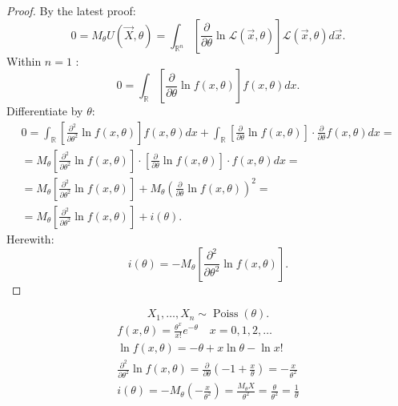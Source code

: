 \begin{proof}
    By the latest proof:
    \[
        0 = M_{\theta} U(\vec{X}, \theta) = \int_{\mathbb{R}^{n}}^{} 
        \left[ \frac{\partial }{\partial \theta} \ln
        \mathcal{L}(\vec{x}, \theta) \right] \mathcal{L}(\vec{x}, \theta) d\vec{x}
    .\] 
    Within $n = 1$ :
    \[
    0 = \int_{\mathbb{R}}^{} \left[ \frac{\partial }{\partial \theta} \ln
    f(x, \theta) \right] f(x, \theta) dx
    .\] 
    Differentiate by $\theta$:
    \begin{gather*}
        0 = \int_{\mathbb{R}}^{} \left[
        \frac{\partial^2}{\partial \theta^2} \ln f(x, \theta) \right]  
        f(x, \theta) dx + \int_{\mathbb{R}}^{} \left[ 
        \frac{\partial }{\partial \theta} \ln f(x, \theta) \right] \cdot
        \frac{\partial}{\partial \theta} f(x, \theta) dx = \\
        = M_{\theta} \left[ \frac{\partial ^2}{\partial \theta^2} \ln
        f(x, \theta) \right] \cdot \left[
        \frac{\partial }{\partial \theta} \ln f(x, \theta) \right] \cdot
        f(x, \theta) dx = \\
        = M_{\theta} \left[ \frac{\partial ^2}{\partial \theta^2} 
        \ln f(x, \theta) \right] + M_{\theta} \left(
        \frac{\partial }{\partial \theta} \ln f(x, \theta) \right) ^2 = \\
        = M_{\theta} \left[ \frac{\partial^2}{\partial \theta^2}
        \ln f(x, \theta) \right] + i(\theta).
    \end{gather*}
    Herewith:
    \[
    i(\theta) = -M_{\theta} \left[ \frac{\partial ^2}{\partial \theta^2}
    \ln f(x, \theta) \right]
    .\] 
\end{proof}

\begin{example}
    \[
    X_{1}, \ldots, X_{n} \sim \operatorname{Poiss}(\theta)
    .\] 
    \begin{gather*}
        f(x, \theta) = \frac{\theta^{x}}{x!} e^{-\theta} \quad x = 0,1,2,\ldots \\
        \ln f(x, \theta) = -\theta + x \ln \theta - \ln x! \\
        \frac{\partial ^2}{\partial \theta^2} \ln f(x, \theta) = 
        \frac{\partial }{\partial \theta} (-1 + \frac{x}{\theta}) =
        -\frac{x}{\theta^2} \\
        i(\theta) = - M_{\theta} \left( -\frac{x}{\theta^2} \right) = 
        \frac{M_{\theta}X}{\theta^2} = \frac{\theta}{\theta^2} =
        \frac{1}{\theta}
    \end{gather*}
\end{example}

